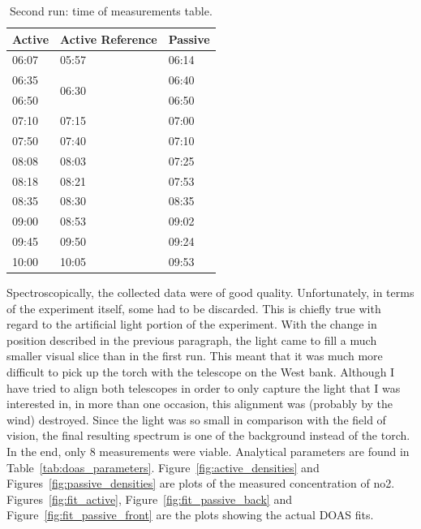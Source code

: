 \begin{table}[htpb]
    \centering
    \caption{Second run: time of measurements table.}
    \label{tab:second_run_measurements}
    \begin{tabular}{@{}lll@{}}
    \toprule
    \textbf{Active} & \textbf{Active Reference} & \textbf{Passive} \\ \midrule
    06:07           & 05:57                     & 06:14            \\
    \midrule
    06:35           & \multirow{2}{*}{06:30}    & 06:40            \\
    \midrule
    06:50           &                           & 06:50            \\
    \midrule
    07:10           & 07:15                     & 07:00            \\
    \midrule
    07:50           & 07:40                     & 07:10            \\
    \midrule
    08:08           & 08:03                     & 07:25            \\
    \midrule
    08:18           & 08:21                     & 07:53            \\
    \midrule
    08:35           & 08:30                     & 08:35            \\
    \midrule
    09:00           & 08:53                     & 09:02            \\
    \midrule
    09:45           & 09:50                     & 09:24            \\
    \midrule
    10:00           & 10:05                     & 09:53            \\ \bottomrule
    \end{tabular}
\end{table}

Spectroscopically, the collected data were of good quality.
Unfortunately, in terms of the experiment itself, some had to be
discarded. This is chiefly true with regard to the artificial light
portion of the experiment. With the change in position described in the
previous paragraph, the light came to fill a much smaller visual slice
than in the first run. This meant that it was much more difficult to
pick up the torch with the telescope on the West bank. Although I have
tried to align both telescopes in order to only capture the light that I
was interested in, in more than one occasion, this alignment was
(probably by the wind) destroyed. Since the light was so small in
comparison with the field of vision, the final resulting spectrum is one
of the background instead of the torch. In the end, only 8 measurements
were viable. Analytical parameters are found in
Table~\ref{tab:doas_parameters}. Figure~\ref{fig:active_densities} and
Figures~\ref{fig:passive_densities} are plots of the measured
concentration of \gls{no2}. Figures~\ref{fig:fit_active},
Figure~\ref{fig:fit_passive_back} and Figure~\ref{fig:fit_passive_front}
are the plots showing the actual \gls{DOAS} fits.

